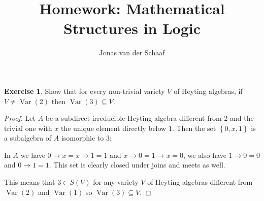 \documentclass{article}
\title{Homework: Mathematical Structures in Logic}
\author{Jonas van der Schaaf}
\date{}
\newcommand{\set}[1]{\left\{#1\right\}}
\DeclareMathOperator{\var}{Var}
\theoremstyle{definition}
\newtheorem{question}{Exercise}
\begin{document}
\maketitle

\begin{question}
    Show that for every non-trivial variety \(V\) of Heyting algebras, if
    \(V\neq \var(2)\) then \(\var(3)\subseteq V\).

    \begin{proof}
        Let \(A\) be a subdirect irreducible Heyting algebra different from
        \(2\) and the trivial one with \(x\) the unique element directly below
        \(1\). Then the set \(\set{0,x,1}\) is a subalgebra of \(A\) isomorphic
        to \(3\):

        In \(A\) we have \(0\to x=x\to 1=1\) and \(x\to 0=1\to x=0\), we also
        have \(1\to0=0\) and \(0\to1=1\). This set is clearly closed under joins
        and meets as well.

        This means that \(3\in S(V)\) for any variety \(V\) of Heyting algebras
        different from \(\var(2)\) and \(\var(1)\) so \(\var(3)\subseteq V\).
    \end{proof}
\end{question}
\end{document}
